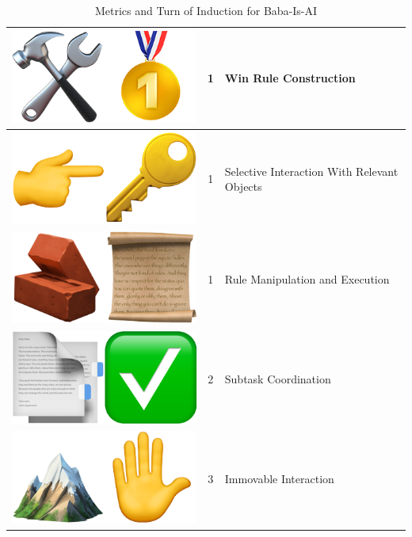 \begin{table}
\begin{tabular}{ccl}
\midrule
\rowcolor{gray!30} \includegraphics[scale=0.07]{figs/emojis/emoji_5.png} & 1 & Win Rule Construction \\
\midrule
\rowcolor{gray!30} \includegraphics[scale=0.07]{figs/emojis/emoji_6.png} & 1 & Selective Interaction With Relevant Objects  \\
\midrule
\rowcolor{gray!30} \includegraphics[scale=0.07]{figs/emojis/emoji_7.png} & 1 & Rule Manipulation and Execution  \\
\midrule
\rowcolor{gray!60} \includegraphics[scale=0.07]{figs/emojis/emoji_8.png} & 2 & Subtask Coordination \\
\midrule
\rowcolor{gray!90} \includegraphics[scale=0.07]{figs/emojis/emoji_9.png} & 3 & Immovable Interaction \\
\bottomrule
\end{tabular}
\caption{Metrics and Turn of Induction \newline for Baba-Is-AI}
\label{tab:metrics}
\end{table}